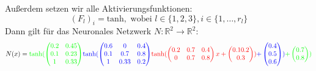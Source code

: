 \documentclass[12pt,letterpaper,ngerman]{article}
\begin{document}
{\begin{example}
\[  \]
  Außerdem setzen wir alle Aktivierungsfunktionen:
  \[
    (F_{l})_i = \text{tanh}, \text{ wobei } l \in \{ 1, 2, 3\},
      i \in \{1, \dots, r_l\}
  \]
  Dann gilt für das Neuronales Netzwerk $N: \mathbb{R}^2 \to \mathbb{R}^2$:
  \[
    N(x) = 
    {\color{green}
    \text{tanh}(\begin{pmatrix} 0.2 & 0.45 \\ 0.1 & 0.23 \\ 1 & 0.33 \end{pmatrix}
    }
    {\color{blue}
    \text{tanh}(\begin{pmatrix} 0.6 & 0 & 0.4 \\ 0.1 & 0.7 & 0.8 \\ 1 & 0.33 & 0.2 \end{pmatrix}
    }
    {\color{red}
    \text{tanh}(\begin{pmatrix} 0.2 & 0.7 & 0.4 \\ 0 & 0.7 & 0.8 \end{pmatrix}x
      + \begin{pmatrix} 0.1  0.2 \\ 0.3\end{pmatrix})} 
    {\color{blue}
      + 
    \begin{pmatrix} 0.4 \\ 0.5 \\ 0.6\end{pmatrix})}
    { \color{green}
    +
    \begin{pmatrix} 0.7  \\ 0.8 \end{pmatrix})
    }
  \]
  \begin{figure}[H]
    \begin{center}
\end{center}
\end{figure}
\end{example}}
\end{document}
